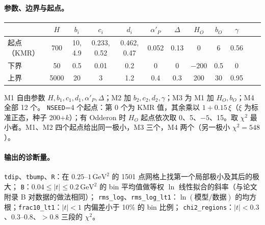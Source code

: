 \documentclass[11pt,a4paper]{ctexart}
\newcommand{\GeVt}{\,\mathrm{GeV}^2}
\begin{document}
\paragraph{参数、边界与起点。}
\begin{center}\small
\begin{tabular}{lccccccccccc}
\toprule
 & $H$ & $b_i$ & $c_i$ & $d_i$ & $\alpha'_P$ & $\Delta$ & $H_O$ & $b_O$ & $\gamma$\\
\midrule
起点（KMR） & 700 & 10, 4.9 & 0.233, 0.52 & 0.462, 0.47 & 0.052 & 0.13 & 0 & 6 & 0.56\\
下界 & 50 & 0.5 & 0.01 & 0.2 & 0 & 0 & $-200$ & 0.5 & 0\\
上界 & 5000 & 20 & 3 & 1.2 & 0.4 & 0.3 & 200 & 30 & 0.95\\
\bottomrule
\end{tabular}
\end{center}
M1 自由参数 $H,b_1,c_1,d_1,\alpha'_P,\Delta$；M2 加 $b_2,c_2,d_2,\gamma$；M3 为 M1 加 $H_O,b_O$；M4 全部 12 个。
\texttt{NSEED}=4 个起点：第 0 个为 KMR 值，其余乘以 $1+0.15\,\xi$（$\xi$ 为标准正态，种子 200+$k$）；有 Odderon 时 $H_O$ 起点依次取
0、5、$-5$、15。取 $\chi^2$ 最小者。M1、M2 四个起点给出同一极小，M3 三个，M4 两个（另一极小 $\chi^2=548$）。

\paragraph{输出的诊断量。}\texttt{tdip}、\texttt{tbump}、\texttt{R}：在 $0.25$--$1\GeVt$ 的 1501 点网格上找第一个局部极小及其后的极大；
\texttt{B}：$0.04\le|t|\le0.2\GeVt$ 的 bin 平均值做等权 $\ln$ 线性拟合的斜率（与论文附录 B 对数据的做法相同）；
\texttt{rms\_log}、\texttt{rms\_log\_lt1}：$\ln(\text{模型}/\text{数据})$ 的均方根；\texttt{frac10\_lt1}：$|t|<1$ 内偏差小于 10\% 的 bin 比例；
\texttt{chi2\_regions}：$|t|<0.3$、0.3--0.8、$>0.8$ 三段的 $\chi^2$。
\end{document}
